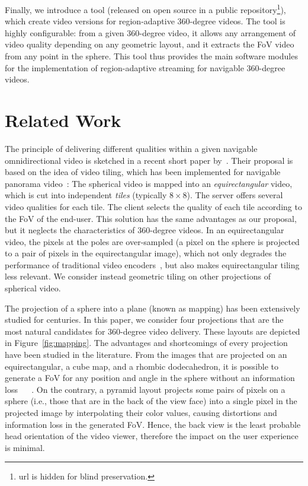 Finally, we introduce a tool (released on open source in a public
repository\footnote{url is hidden for blind
preservation.}), which create video versions for region-adaptive 360-degree videos.
The tool is highly configurable: from a given 360-degree video, it allows
any arrangement of video quality depending on any geometric layout, and it
extracts the
\ac{FoV} video from any point in the sphere. This tool thus provides the
main software modules for the implementation of region-adaptive streaming
for navigable 360-degree videos.


\section{Related Work}
\label{sec:relatedwork}

The principle of delivering different qualities within a given navigable omnidirectional video is sketched
in a recent short paper by~\citet{ochi_live_2015}. Their proposal is based on the idea of video
tiling, which has been implemented for navigable panorama
video~\cite{sanchez_compressed_2015,wang_mixing_2014,gaddam_tiling_2015}:
The spherical video is mapped into an \emph{equirectangular} video, which
is cut into independent \emph{tiles} (typically $8\times 8$). The server offers several
video qualities for each tile. The client selects the quality of each tile according to
the \ac{FoV} of the end-user. This
solution has the same advantages as our proposal, but it neglects
the characteristics of 360-degree
videos. In an equirectangular video, the pixels
at the poles are over-sampled (a pixel on the sphere is projected to a pair of pixels in the equirectangular image), which not only degrades the
performance of traditional video encoders~\cite{wojciechowski_h.264_2006,yu_framework_2015}, but also
makes equirectangular tiling less relevant. We consider instead geometric tiling on
other projections of spherical video.

The projection of a sphere into a plane (known as mapping) has been extensively studied
for centuries. In this paper, we consider four projections that are the most natural
candidates for 360-degree video delivery. These layouts are depicted in Figure~\ref{fig:mapping}. The advantages and shortcomings of every projection have been studied in the literature. From
the images that are
projected on an equirectangular, a cube map, and a rhombic dodecahedron, it is possible
to generate a \ac{FoV}
for any position and angle in the sphere without an information loss ~\cite{Ng2005} ~\cite{fu_rhombic_2009}. On the
contrary, a pyramid layout projects some pairs of pixels on a sphere (i.e., those that are in the back of the view face) into a single pixel in the projected image by interpolating their color values, causing distortions and information loss in the generated FoV. Hence, the back view is the least probable head orientation of the video viewer, therefore the impact on the user experience is minimal.

